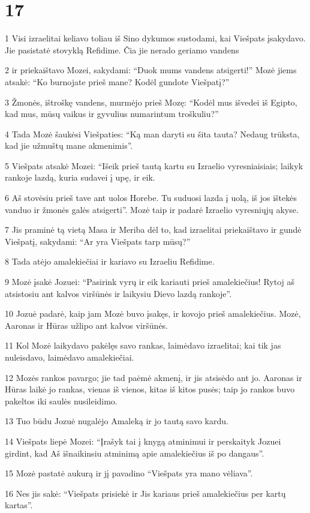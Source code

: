 \chapter{17}


\par 1 Visi izraelitai keliavo toliau iš Sino dykumos sustodami, kai Viešpats įsakydavo. Jie pasistatė stovyklą Refidime. Čia jie nerado geriamo vandens 
\par 2 ir priekaištavo Mozei, sakydami: “Duok mums vandens atsigerti!” Mozė jiems atsakė: “Ko burnojate prieš mane? Kodėl gundote Viešpatį?” 
\par 3 Žmonės, ištroškę vandens, murmėjo prieš Mozę: “Kodėl mus išvedei iš Egipto, kad mus, mūsų vaikus ir gyvulius numarintum troškuliu?” 
\par 4 Tada Mozė šaukėsi Viešpaties: “Ką man daryti su šita tauta? Nedaug trūksta, kad jie užmuštų mane akmenimis”. 
\par 5 Viešpats atsakė Mozei: “Išeik prieš tautą kartu su Izraelio vyresniaisiais; laikyk rankoje lazdą, kuria sudavei į upę, ir eik. 
\par 6 Aš stovėsiu prieš tave ant uolos Horebe. Tu suduosi lazda į uolą, iš jos ištekės vanduo ir žmonės galės atsigerti”. Mozė taip ir padarė Izraelio vyresniųjų akyse. 
\par 7 Jis praminė tą vietą Masa ir Meriba dėl to, kad izraelitai priekaištavo ir gundė Viešpatį, sakydami: “Ar yra Viešpats tarp mūsų?” 
\par 8 Tada atėjo amalekiečiai ir kariavo su Izraeliu Refidime. 
\par 9 Mozė įsakė Jozuei: “Pasirink vyrų ir eik kariauti prieš amalekiečius! Rytoj aš atsistosiu ant kalvos viršūnės ir laikysiu Dievo lazdą rankoje”. 
\par 10 Jozuė padarė, kaip jam Mozė buvo įsakęs, ir kovojo prieš amalekiečius. Mozė, Aaronas ir Hūras užlipo ant kalvos viršūnės. 
\par 11 Kol Mozė laikydavo pakėlęs savo rankas, laimėdavo izraelitai; kai tik jas nuleisdavo, laimėdavo amalekiečiai. 
\par 12 Mozės rankos pavargo; jie tad paėmė akmenį, ir jis atsisėdo ant jo. Aaronas ir Hūras laikė jo rankas, vienas iš vienos, kitas iš kitos pusės; taip jo rankos buvo pakeltos iki saulės nusileidimo. 
\par 13 Tuo būdu Jozuė nugalėjo Amaleką ir jo tautą savo kardu. 
\par 14 Viešpats liepė Mozei: “Įrašyk tai į knygą atminimui ir perskaityk Jozuei girdint, kad Aš išnaikinsiu atminimą apie amalekiečius iš po dangaus”. 
\par 15 Mozė pastatė aukurą ir jį pavadino “Viešpats yra mano vėliava”. 
\par 16 Nes jis sakė: “Viešpats prisiekė ir Jis kariaus prieš amalekiečius per kartų kartas”.



